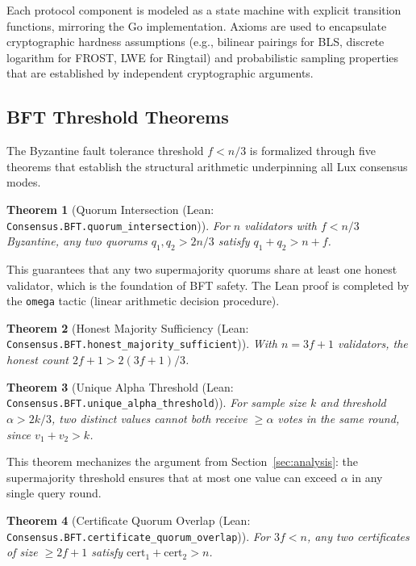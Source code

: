 \documentclass[11pt,a4paper]{article}
\newtheorem{theorem}{Theorem}[section]
\begin{document}
Each protocol component is modeled as a state machine with explicit transition
functions, mirroring the Go implementation. Axioms are used to encapsulate cryptographic
hardness assumptions (e.g., bilinear pairings for BLS, discrete logarithm for FROST,
LWE for Ringtail) and probabilistic sampling properties that are established by
independent cryptographic arguments.

\subsection{BFT Threshold Theorems}

The Byzantine fault tolerance threshold $f < n/3$ is formalized through five theorems
that establish the structural arithmetic underpinning all Lux consensus modes.

\begin{theorem}[Quorum Intersection (Lean: \texttt{Consensus.BFT.quorum\_intersection})]
\label{thm:formal-quorum}
For $n$ validators with $f < n/3$ Byzantine,
any two quorums $q_1, q_2 > 2n/3$ satisfy $q_1 + q_2 > n + f$.
\end{theorem}

This guarantees that any two supermajority quorums share at least one honest validator,
which is the foundation of BFT safety. The Lean proof is completed by the \texttt{omega}
tactic (linear arithmetic decision procedure).

\begin{theorem}[Honest Majority Sufficiency (Lean: \texttt{Consensus.BFT.honest\_majority\_sufficient})]
\label{thm:formal-honest}
With $n = 3f + 1$ validators, the honest count $2f + 1 > 2(3f+1)/3$.
\end{theorem}

\begin{theorem}[Unique Alpha Threshold (Lean: \texttt{Consensus.BFT.unique\_alpha\_threshold})]
\label{thm:formal-alpha}
For sample size $k$ and threshold $\alpha > 2k/3$, two distinct values cannot both
receive $\geq \alpha$ votes in the same round, since $v_1 + v_2 > k$.
\end{theorem}

This theorem mechanizes the argument from Section~\ref{sec:analysis}: the supermajority
threshold ensures that at most one value can exceed $\alpha$ in any single query round.

\begin{theorem}[Certificate Quorum Overlap (Lean: \texttt{Consensus.BFT.certificate\_quorum\_overlap})]
For $3f < n$, any two certificates of size $\geq 2f+1$ satisfy $\text{cert}_1 + \text{cert}_2 > n$.
\end{theorem}
\end{document}
